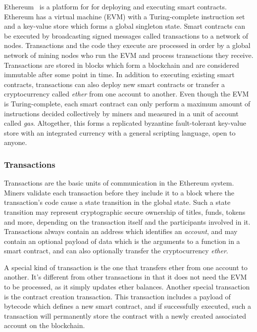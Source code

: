 Ethereum~\cite{wood2018ethereum} is a platform for for deploying and executing smart contracts. Ethereum has a virtual machine (EVM) with a Turing-complete instruction set and a key-value store which forms a global singleton state. Smart contracts can be executed by broadcasting signed messages called transactions to a network of nodes. Transactions and the code they execute are processed in order by a global network of mining nodes who run the EVM and process transactions they receive. Transactions are stored in blocks which form a blockchain and are considered immutable after some point in time. In addition to executing existing smart contracts, transactions can also deploy new smart contracts or transfer a cryptocurrency called \emph{ether} from one account to another. Even though the EVM is Turing-complete, each smart contract can only perform a maximum amount of instructions decided collectively by miners and measured in a unit of account called \emph{gas}. Altogether, this forms a replicated byzantine fault-tolerant key-value store with an integrated currency with a general scripting language, open to anyone.

\subsubsection{Transactions}
Transactions are the basic units of communication in the Ethereum system. Miners validate each transaction before they include it to a block where the transaction's code cause a state transition in the global state. Such a state transition may represent cryptographic secure ownership of titles, funds, tokens and more, depending on the transaction itself and the participants involved in it. Transactions always contain an address which identifies an \emph{account}, and may contain an optional payload of data which is the arguments to a function in a smart contract, and can also optionally transfer the cryptocurrency \emph{ether}. 

A special kind of transaction is the one that transfers ether from one account to another. It's different from other transactions in that it does not need the EVM to be processed, as it simply updates ether balances. Another special transaction is the contract creation transaction. This transaction includes a payload of bytecode which defines a new smart contract, and if successfully executed, such a transaction will permanently store the contract with a newly created associated account on the blockchain.

